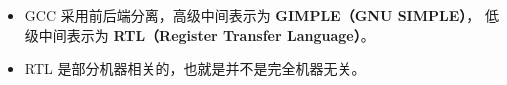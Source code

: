 
\begin{itemize}
\item GCC 采用前后端分离，高级中间表示为 \textbf{GIMPLE（GNU SIMPLE）}， 低级中间表示为 \textbf{RTL（Register Transfer Language）}。
\item RTL 是部分机器相关的，也就是并不是完全机器无关。
\end{itemize}
